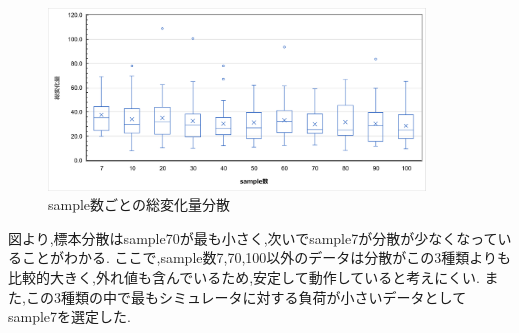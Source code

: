 \documentclass{ltjsreport}
\begin{document}
		\begin{figure}[H]
		\centering
		\includegraphics[width = 10cm]{../figs/FVRALL.png}
		\caption{sample数ごとの総変化量分散}
		\label{fig:FVRdata}
		\end{figure}
		\vspace{-15pt}
		図より,標本分散はsample70が最も小さく,次いでsample7が分散が少なくなっていることがわかる.
		ここで,sample数7,70,100以外のデータは分散がこの3種類よりも比較的大きく,外れ値も含んでいるため,安定して動作していると考えにくい.
		また,この3種類の中で最もシミュレータに対する負荷が小さいデータとしてsample7を選定した.
\clearpage
\end{document}
